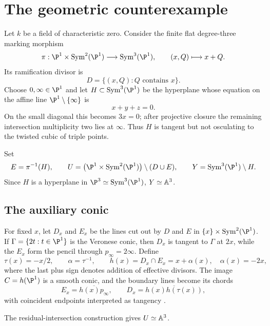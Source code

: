 \section{The geometric counterexample}\label{sec:geometric-construction}

Let $k$ be a field of characteristic zero.  Consider the finite flat
degree-three marking morphism
\[
 \pi:\P^1\times\operatorname{Sym}^2(\P^1)
 \longrightarrow\operatorname{Sym}^3(\P^1),\qquad
 (x,Q)\longmapsto x+Q.
\]
Its ramification divisor is
\[
 D=\{(x,Q):Q\text{ contains }x\}.
\]
Choose $0,\infty\in\P^1$ and let $H\subset\operatorname{Sym}^3(\P^1)$ be
the hyperplane whose equation on the affine line
$\P^1\setminus\{\infty\}$ is
\begin{equation}\label{eq:zero-sum-hyperplane}
 x+y+z=0.
\end{equation}
On the small diagonal this becomes $3x=0$; after projective closure the
remaining intersection multiplicity two lies at $\infty$.  Thus $H$ is
tangent but not osculating to the twisted cubic of triple points.

Set
\[
 E=\pi^{-1}(H),\qquad
 U=\bigl(\P^1\times\operatorname{Sym}^2(\P^1)\bigr)\setminus(D\cup E),
 \qquad Y=\operatorname{Sym}^3(\P^1)\setminus H.
\]
Since $H$ is a hyperplane in $\P^3\simeq\operatorname{Sym}^3(\P^1)$,
$Y\simeq\mathbb A^3$.

\subsection{The auxiliary conic}

For fixed $x$, let $D_x$ and $E_x$ be the lines cut out by $D$ and $E$ in
$\{x\}\times\operatorname{Sym}^2(\P^1)$.  If
$\Gamma=\{2t:t\in\P^1\}$ is the Veronese conic, then $D_x$ is tangent to
$\Gamma$ at $2x$, while the $E_x$ form the pencil through
$p_\infty=2\infty$.  Define
\[
 \tau(x)=-x/2,\qquad \alpha=\tau^{-1},\qquad
 h(x)=D_x\cap E_x=x+\alpha(x),\quad \alpha(x)=-2x,
\]
where the last plus sign denotes addition of effective divisors.  The image
$C=h(\P^1)$ is a smooth conic, and the boundary lines become its chords
\begin{equation}\label{eq:auxiliary-chords}
 E_x=\overline{h(x)p_\infty},\qquad
 D_x=\overline{h(x)h(\tau(x))},
\end{equation}
with coincident endpoints interpreted as tangency
\cite{rezchikov-geometric}.

\begin{proposition}\label{prop:geometric-affine-source}
The residual-intersection construction gives $U\simeq\mathbb A^3$.
\end{proposition}

